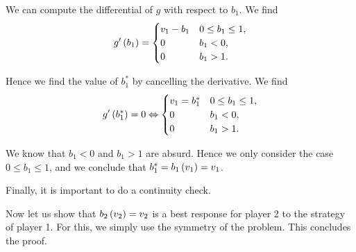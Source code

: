 We can compute the differential of $g$ with respect to $b_1$. We find
\begin{equation*}
    g' \left(b_1\right)
    =
    \begin{cases}
       v_1 - b_1  & 0 \leq b_1 \leq 1, \\
       0 & b_1 < 0, \\
       0 & b_1 > 1. \\
     \end{cases}
\end{equation*}

Hence we find the value of $b_1^{*}$ by cancelling the derivative. We find
\begin{equation*}
    g' \left(b_1^{*}\right) = 0
    \Leftrightarrow
    \begin{cases}
       v_1 = b_1^{*}  & 0 \leq b_1 \leq 1, \\
       0 & b_1 < 0, \\
       0 & b_1 > 1. \\
     \end{cases}
\end{equation*}

We know that $b_1 < 0$ and $b_1 > 1$ are absurd. Hence we only consider the case $0 \leq b_1 \leq 1$, and we conclude that $b_1^{*} = b_1 \left(v_1\right) = v_1$.

Finally, it is important to do a continuity check.


\vspace{5mm}

Now let us show that $b_2 \left(v_2\right) = v_2$ is a best response for player 2 to the strategy of player 1. For this, we simply use the symmetry of the problem. This concludes the proof.
